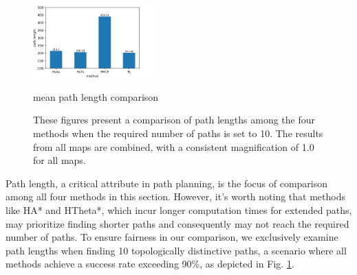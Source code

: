 \documentclass[lettersize,journal]{IEEEtran}
\begin{document}
\begin{figure}[t] \scriptsize
  \centerline{\includegraphics[width=4.6cm]{method_path_length.png}}
  \centerline{mean path length comparison}
\caption{These figures present a comparison of path lengths among the four methods when the required number of paths is set to 10. The results from all maps are combined, with a consistent magnification of 1.0 for all maps. }
\label{compariosn_path_length}
\end{figure}



Path length, a critical attribute in path planning, is the focus of comparison among all four methods in this section. However, it's worth noting that methods like HA* and HTheta*, which incur longer computation times for extended paths, may prioritize finding shorter paths and consequently may not reach the required number of paths. To ensure fairness in our comparison, we exclusively examine path lengths when finding 10 topologically distinctive paths, a scenario where all methods achieve a success rate exceeding 90\%, as depicted in Fig. \ref{compariosn_path_length}.
\end{document}
